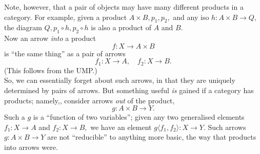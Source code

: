 Note, however, that a pair of objects may have many different products in a category. For example, given a product $A \times B, p_1, p_2,$ and any iso $h:A\times B \to Q,$ the diagram $Q, p_1\circ h, p_2\circ h$ is also a product of $A$ and $B.$\\
Now an arrow \emph{into} a product
\begin{equation*} 
	f : X \to A \times B
\end{equation*}
is ``the same thing'' as a pair of arrows
\begin{equation*} 
	f_1:X\to A, \quad f_2: X\to B.
\end{equation*}
(This follows from the UMP.)\\
So, we can essentially forget about such arrows, in that they are uniquely determined by pairs of arrows. But something useful \emph{is} gained if a category has products; namely,, consider arrows \emph{out} of the product,
\begin{equation*} 
	g:A\times B \to Y.
\end{equation*}
Such a $g$ is a ``function of two variables''; given any two generalised elements $f_1:X\to A$ and $f_2:X\to B,$ we have an element $g\langle f_1, f_2\rangle:X \to Y.$ Such arrows $g:A \times B \to Y$ are not ``reducible'' to anything more basic, the way that products into arrows were.
%
%
